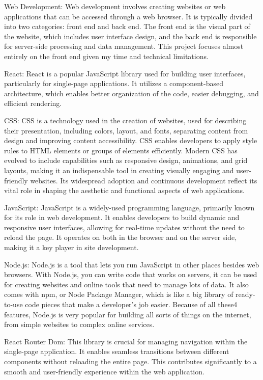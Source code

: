 \documentclass[10pt,twocolumn]{article}
\begin{document}
\noindent Web Development: Web development involves creating websites or web applications that can be accessed through a web browser. It is typically divided into two categories: front end and back end. The front end is the visual part of the website, which includes user interface design, and the back end is responsible for server-side processing and data management. This project focuses almost entirely on the front end given my time and technical limitations. 

\noindent React: React is a popular JavaScript library used for building user interfaces, particularly for single-page applications. It utilizes a component-based architecture, which enables better organization of the code, easier debugging, and efficient rendering. \cite{ReactJS}

\noindent CSS: CSS is a technology used in the creation of websites, used for describing their presentation, including colors, layout, and fonts, separating content from design and improving content accessibility. CSS enables developers to apply style rules to HTML elements or groups of elements efficiently. Modern CSS has evolved to include capabilities such as responsive design, animations, and grid layouts, making it an indispensable tool in creating visually engaging and user-friendly websites. Its widespread adoption and continuous development reflect its vital role in shaping the aesthetic and functional aspects of web applications.

\noindent JavaScript: JavaScript is a widely-used programming language, primarily known for its role in web development. It enables developers to build dynamic and responsive user interfaces, allowing for real-time updates without the need to reload the page. It operates on both in the browser and on the server side, making it a key player in site development. 

\noindent Node.js: Node.js is a tool that lets you run JavaScript in other places besides web browsers. With Node.js, you can write code that works on servers, it can be used for creating websites and online tools that need to manage lots of data. It also comes with npm, or Node Package Manager, which is like a big library of ready-to-use code pieces that make a developer's job easier. Because of all these4 features, Node.js is very popular for building all sorts of things on the internet, from simple websites to complex online services.

\noindent React Router Dom: This library is crucial for managing navigation within the single-page application. It enables seamless transitions between different components without reloading the entire page. This contributes significantly to a smooth and user-friendly experience within the web application.
\end{document}
